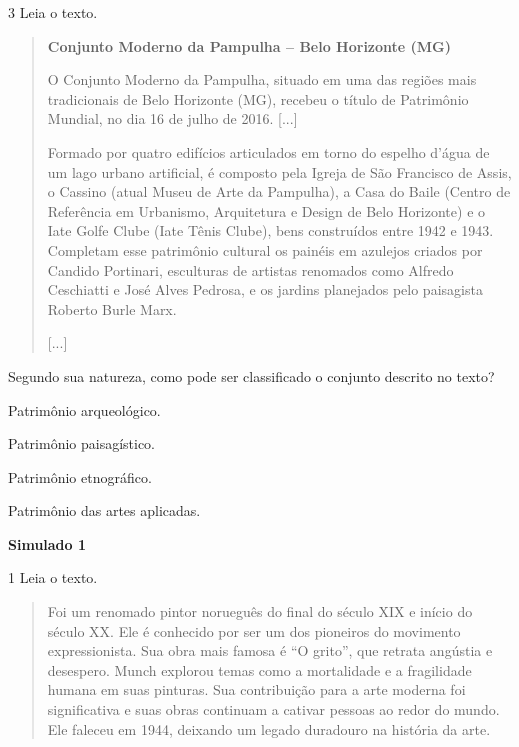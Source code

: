 \num{3} Leia o texto.

\begin{quote}
\textbf{Conjunto Moderno da Pampulha -- Belo Horizonte (MG)}

O Conjunto Moderno da Pampulha, situado em uma das regiões mais
tradicionais de Belo Horizonte (MG), recebeu o título de Patrimônio
Mundial, no dia 16 de julho de 2016. {[}...{]}

Formado por quatro edifícios articulados em torno do espelho d'água de
um lago urbano artificial, é composto pela Igreja de São Francisco de
Assis, o Cassino (atual Museu de Arte da Pampulha), a Casa do Baile
(Centro de Referência em Urbanismo, Arquitetura e Design de Belo
Horizonte) e o Iate Golfe Clube (Iate Tênis Clube), bens construídos
entre 1942 e 1943. Completam esse patrimônio cultural os painéis em
azulejos criados por Candido Portinari, esculturas de artistas renomados
como Alfredo Ceschiatti e José Alves Pedrosa, e os jardins planejados
pelo paisagista Roberto Burle Marx.

{[}...{]}

\end{quote}

Segundo sua natureza, como pode ser classificado o conjunto descrito no texto?

\begin{escolha}
\item
  Patrimônio arqueológico.
\item
  Patrimônio paisagístico.
\item
  Patrimônio etnográfico.
\item
  Patrimônio das artes aplicadas.
\end{escolha}


\textbf{Simulado 1}

\num{1} Leia o texto.

\begin{quote}
Foi um renomado pintor norueguês do final do século XIX e início do século XX. 
Ele é conhecido por ser um dos pioneiros do movimento expressionista. Sua obra 
mais famosa é ``O grito'', que retrata angústia e desespero. Munch explorou temas 
como a mortalidade e a fragilidade humana em suas pinturas. Sua contribuição para 
a arte moderna foi significativa e suas obras continuam a cativar pessoas ao redor 
do mundo. Ele faleceu em 1944, deixando um legado duradouro na história da arte.

\end{quote}

